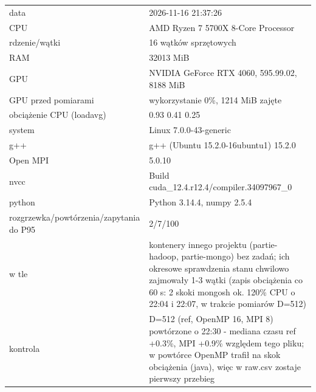 \begin{tabular}{@{}lp{10.5cm}@{}}
\toprule
data & 2026-11-16 21:37:26 \\
CPU & AMD Ryzen 7 5700X 8-Core Processor \\
rdzenie/wątki & 16 wątków sprzętowych \\
RAM & 32013 MiB \\
GPU & NVIDIA GeForce RTX 4060, 595.99.02, 8188 MiB \\
GPU przed pomiarami & wykorzystanie 0\%, 1214 MiB zajęte \\
obciążenie CPU (loadavg) & 0.93 0.41 0.25 \\
system & Linux 7.0.0-43-generic \\
g++ & g++ (Ubuntu 15.2.0-16ubuntu1) 15.2.0 \\
Open MPI & 5.0.10 \\
nvcc & Build cuda\_12.4.r12.4/compiler.34097967\_0 \\
python & Python 3.14.4, numpy 2.5.4 \\
rozgrzewka/powtórzenia/zapytania do P95 & 2/7/100 \\
w tle & kontenery innego projektu (partie-hadoop, partie-mongo) bez zadań; ich okresowe sprawdzenia stanu chwilowo zajmowały 1-3 wątki (zapis obciążenia co 60 s: 2 skoki mongosh ok. 120\% CPU o 22:04 i 22:07, w trakcie pomiarów D=512) \\
kontrola & D=512 (ref, OpenMP 16, MPI 8) powtórzone o 22:30 - mediana czasu ref +0.3\%, MPI +0.9\% względem tego pliku; w powtórce OpenMP trafił na skok obciążenia (java), więc w raw.csv zostaje pierwszy przebieg \\
\bottomrule
\end{tabular}
